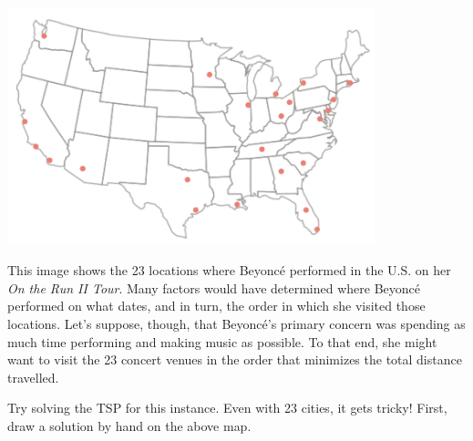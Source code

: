 \documentclass[twoside]{article}%
\begin{document}
\begin{center}
\includegraphics[width=0.8\textwidth]{BeyonceGraph.png}
\end{center}

This image shows the 23 locations where Beyonc\'{e} performed in the U.S. on her \emph{On the Run II Tour}.  Many factors would have determined where Beyonc\'{e} performed on what dates, and in turn, the order in which she visited those locations.  Let's suppose, though, that Beyonc\'{e}'s primary concern was spending as much time performing and making music as possible.  To that end, she might want to visit the 23 concert venues in the order that minimizes the total distance travelled.  

\vskip 5mm
\noindent
Try solving the TSP for this instance.  Even with 23 cities, it gets tricky!  First, draw a solution by hand on the above map.
\end{document}
